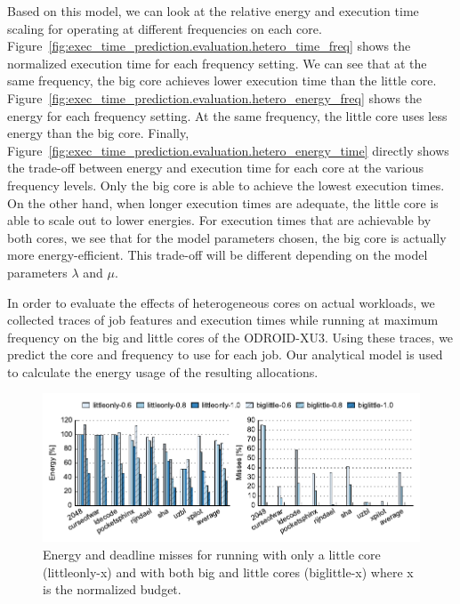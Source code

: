Based on this model, we can look at the relative energy and execution time
scaling for operating at different frequencies on each core.
Figure~\ref{fig:exec_time_prediction.evaluation.hetero_time_freq} shows the
normalized execution time for each frequency setting. We can see that at the
same frequency, the big core achieves lower execution time than the little
core. Figure~\ref{fig:exec_time_prediction.evaluation.hetero_energy_freq} shows
the energy for each frequency setting. At the same frequency, the little core
uses less energy than the big core. Finally,
Figure~\ref{fig:exec_time_prediction.evaluation.hetero_energy_time} directly
shows the trade-off between energy and execution time for each core at the
various frequency levels. Only the big core is able to achieve the lowest execution
times. On the other hand, when longer execution times are adequate, the little
core is able to scale out to lower energies. For execution times that are
achievable by both cores, we see that for the model parameters chosen,
the big core is actually more energy-efficient. This trade-off will be
different depending on the model parameters $\lambda$ and $\mu$.

In order to evaluate the effects of heterogeneous cores on actual workloads, we
collected traces of job features and execution times while running at maximum
frequency on the big and little cores of the ODROID-XU3. Using these traces, we
predict the core and frequency to use for each job. Our analytical model is
used to calculate the energy usage of the resulting allocations.

\begin{figure}
  \begin{center}
    \includegraphics{exec_time_prediction/data/hetero_little_em.pdf}
    \caption{Energy and deadline misses for running with only a little core
    (littleonly-x) and with both big and little cores (biglittle-x) where x is
    the normalized budget.}
    \label{fig:exec_time_prediction.evaluation.hetero_little_em}
  \end{center}
\end{figure}

